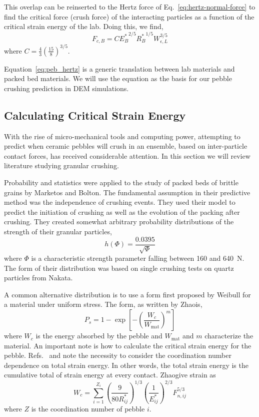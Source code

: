This overlap can be reinserted to the Hertz force of Eq.~\ref{eq:hertz-normal-force} to find the critical force (crush force) of the interacting particles as a function of the critical strain energy of the lab. Doing this, we find,
\begin{equation}\label{eq:peb_hertz}
	F_{c,B} = C{E_B^*}^{2/5}{R_B^*}^{1/5}W_{\epsilon,L}^{3/5}
\end{equation}
where $C = \frac{4}{3}\left(\frac{15}{8}\right)^{3/5}$.

Equation~\ref{eq:peb_hertz} is a generic translation between lab materials and packed bed materials. We will use the equation as the basis for our pebble crushing prediction in DEM simulations.





\subsection{Calculating Critical Strain Energy}
With the rise of micro-mechanical tools and computing power, attempting to predict when ceramic pebbles will crush in an ensemble, based on inter-particle contact forces, has received considerable attention. In this section we will review literature studying granular crushing.

Probability and statistics were applied to the study of packed beds of brittle grains by Marketos and Bolton\cite{Marketos2007}. The fundamental assumption in their predictive method was the independence of crushing events. They used their model to predict the initiation of crushing as well as the evolution of the packing after crushing. They created somewhat arbitrary probability distributions of the strength of their granular particles,
\begin{equation}
	h(\Phi) = \frac{0.0395}{\sqrt{\Phi}}
\end{equation}
where $\Phi$ is a characteristic strength parameter falling between 160 and 640~N. The form of their distribution was based on single crushing tests on quartz particles from Nakata\etal.

A common alternative distribution is to use a form first proposed by Weibull for a material under uniform stress\cite{Kwok2013,Zhao2011,nakata1999probabilistic,Zhao2013,Pitchumani2004}. The form, as written by Zhao\etal is,
\begin{equation}
	P_s = 1 - \exp\left[-\left(\frac{W_c}{W_\text{mat}}\right)^m\right]
\end{equation}
where $W_c$ is the energy absorbed by the pebble and $W_\text{mat}$ and $m$ characterize the material. An important note is how to calculate the critical strain energy for the pebble. Refs.~\cite{Marketos2007} and \cite{Zhao2011} note the necessity to consider the coordination number dependence on total strain energy. In other words, the total strain energy is the cumulative total of strain energy at every contact. Zhao\etal give strain as
\begin{equation}
	W_c = \sum_{i=1}^{Z_i}\left(\frac{9}{80 R_{ij}^*}\right)^{1/3} \left(\frac{1}{E_{ij}^*}\right)^{2/3} F_{n,ij}^{5/3}
\end{equation}
where $Z$ is the coordination number of pebble $i$. 


